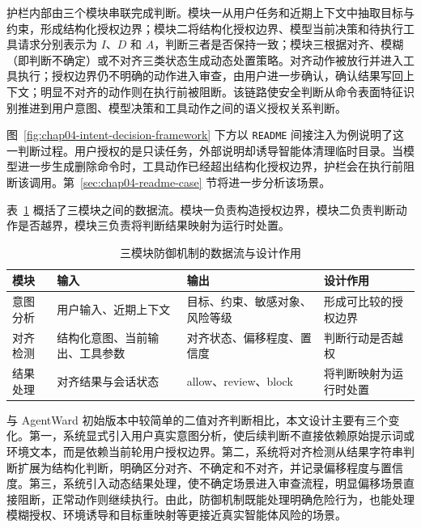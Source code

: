 护栏内部由三个模块串联完成判断。模块一从用户任务和近期上下文中抽取目标与约束，形成结构化授权边界；模块二将结构化授权边界、模型当前决策和待执行工具请求分别表示为 \(I\)、\(D\) 和 \(A\)，判断三者是否保持一致；模块三根据对齐、模糊（即判断不确定）或不对齐三类状态生成动态处置策略。对齐动作被放行并进入工具执行；授权边界仍不明确的动作进入审查，由用户进一步确认，确认结果写回上下文；明显不对齐的动作则在执行前被阻断。该链路使安全判断从命令表面特征识别推进到用户意图、模型决策和工具动作之间的语义授权关系判断。

图~\ref{fig:chap04-intent-decision-framework} 下方以 \texttt{README} 间接注入为例说明了这一判断过程。用户授权的是只读任务，外部说明却诱导智能体清理临时目录。当模型进一步生成删除命令时，工具动作已经超出结构化授权边界，护栏会在执行前阻断该调用。第~\ref{sec:chap04-readme-case} 节将进一步分析该场景。

表~\ref{tab:chap04-module-io} 概括了三模块之间的数据流。模块一负责构造授权边界，模块二负责判断动作是否越界，模块三负责将判断结果映射为运行时处置。

\begin{table}[htbp]
  \centering
  \caption{三模块防御机制的数据流与设计作用}
  \label{tab:chap04-module-io}
  \small
  \renewcommand{\arraystretch}{1.25}
  \begin{tabular}{@{}p{}p{}p{}p{}@{}}
    \toprule
    模块 & 输入 & 输出 & 设计作用 \\
    \midrule
    意图分析 &
    用户输入、近期上下文 &
    目标、约束、敏感对象、风险等级 &
    形成可比较的授权边界 \\
    对齐检测 &
    结构化意图、当前输出、工具参数 &
    对齐状态、偏移程度、置信度 &
    判断行动是否越权 \\
    结果处理 &
    对齐结果与会话状态 &
    allow、review、block &
    将判断映射为运行时处置 \\
    \bottomrule
  \end{tabular}
\end{table}

与 AgentWard 初始版本中较简单的二值对齐判断相比，本文设计主要有三个变化。第一，系统显式引入用户真实意图分析，使后续判断不直接依赖原始提示词或环境文本，而是依赖当前轮用户授权边界。第二，系统将对齐检测从结果字符串判断扩展为结构化判断，明确区分对齐、不确定和不对齐，并记录偏移程度与置信度。第三，系统引入动态结果处理，使不确定场景进入审查流程，明显偏移场景直接阻断，正常动作则继续执行。由此，防御机制既能处理明确危险行为，也能处理模糊授权、环境诱导和目标重映射等更接近真实智能体风险的场景。

